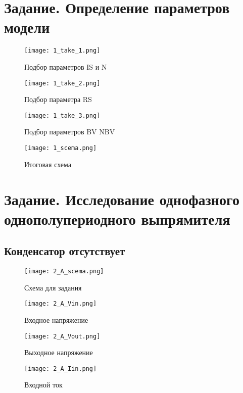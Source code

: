 \documentclass[a4paper,14pt]{article}
\begin{document}


\section{Задание. Определение параметров модели}

\begin{figure}[H]
	\centering
	\texttt{[image: 1\_take\_1.png]}
	\caption{Подбор параметров IS и N}	
\end{figure}

\begin{figure}[H]
	\centering
	\texttt{[image: 1\_take\_2.png]}
	\caption{Подбор параметра RS}	
\end{figure}

\begin{figure}[H]
	\centering
	\texttt{[image: 1\_take\_3.png]}
	\caption{Подбор параметров BV NBV}	
\end{figure}

\begin{figure}[H]
	\centering
	\texttt{[image: 1\_scema.png]}
	\caption{Итоговая схема}	
\end{figure}

\section{Задание. Исследование однофазного однополупериодного выпрямителя}

\subsection{Конденсатор отсутствует}
\begin{figure}[H]
	\centering
	\texttt{[image: 2\_A\_scema.png]}
	\caption{Схема для задания}	
\end{figure}

\begin{figure}[H]
	\centering
	\texttt{[image: 2\_A\_Vin.png]}
	\caption{Входное напряжение}	
\end{figure}

\begin{figure}[H]
	\centering
	\texttt{[image: 2\_A\_Vout.png]}
	\caption{Выходное напряжение}	
\end{figure}

\begin{figure}[H]
	\centering
	\texttt{[image: 2\_A\_Iin.png]}
	\caption{Входной ток}	
\end{figure}
\end{document}
